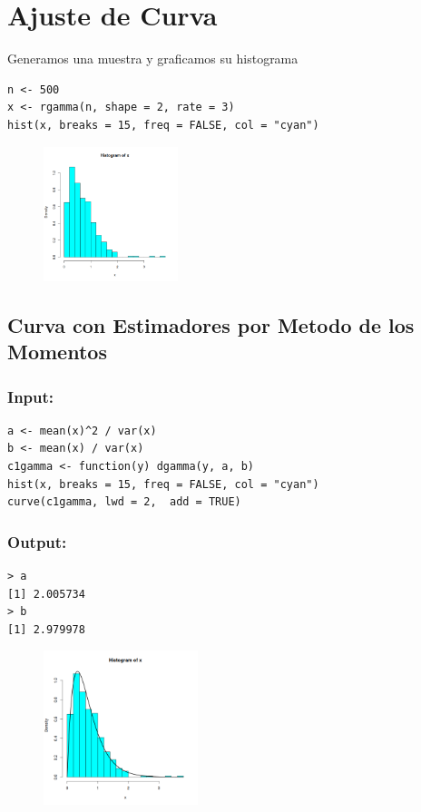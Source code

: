 \documentclass{article}
\begin{document}
    \section{Ajuste de Curva}
    Generamos una muestra y graficamos su histograma
    \begin{verbatim}
n <- 500
x <- rgamma(n, shape = 2, rate = 3)
hist(x, breaks = 15, freq = FALSE, col = "cyan")\end{verbatim}
    \newpage
    \begin{figure}[ht]
        \centering
        \includegraphics[width = 0.35\textwidth]{example2.png}
    \end{figure}

    \subsection{Curva con Estimadores por Metodo de los Momentos}
    \subsubsection{Input:}
    \begin{verbatim}
a <- mean(x)^2 / var(x)
b <- mean(x) / var(x)
c1gamma <- function(y) dgamma(y, a, b)
hist(x, breaks = 15, freq = FALSE, col = "cyan")
curve(c1gamma, lwd = 2,  add = TRUE)\end{verbatim}
    \subsubsection{Output:}
    \begin{verbatim}
> a
[1] 2.005734
> b
[1] 2.979978\end{verbatim}
    
    \begin{figure}[ht]
        \centering
        \includegraphics[width = 0.4\textwidth]{mm.png}
    \end{figure}
\end{document}
